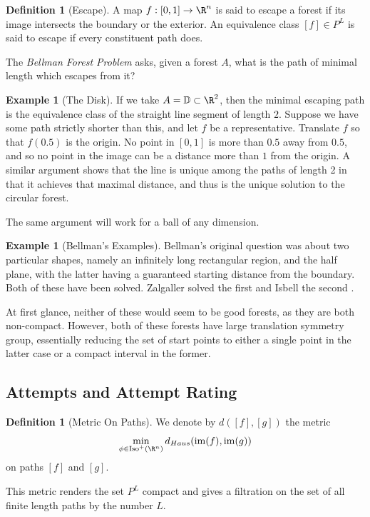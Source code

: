 \documentclass{journal}
\theoremstyle{definition}
\newtheorem{dfn}[thm]{Definition}
\newtheorem{example}[thm]{Example}
\begin{document}
\begin{dfn}[Escape]
A map $f:[0,1]\rightarrow \R^n$ is said to escape a forest if its image intersects the boundary or the exterior. An equivalence class $[f]\in P^L$ is said to escape if every constituent path does.
\end{dfn}
\label{dfn:escape}

The \textit{Bellman Forest Problem} asks, given a forest $A$, what is the path of minimal length which escapes from it?

\begin{example}[The Disk]
If we take $A = \mathbb{D}\subset \R^2$, then the minimal escaping path is the equivalence class of the straight line segment of length $2$.
Suppose we have some path strictly shorter than this, and let $f$ be a representative. Translate $f$ so that $f(0.5)$ is the origin. No point in $[0,1]$ is more than $0.5$ away from $0.5$, and so no point in the image can be a distance more than $1$  from the origin. A similar argument shows that the line is unique among the paths of length 2 in that it achieves that maximal distance, and thus is the unique solution to the circular forest.
\end{example}
\label{example:disk}
The same argument will work for a ball of any dimension.

\begin{example}[Bellman's Examples]
Bellman's original question was about two particular shapes, namely an infinitely long rectangular region, and the half plane, with the latter having a guaranteed starting distance from the boundary. Both of these have been solved. Zalgaller solved the first \cite{Zalgaller1} and Isbell the second \cite{isbell1957optimal}.

At first glance, neither of these would seem to be good forests, as they are both non-compact. However, both of these forests have large translation symmetry group, essentially reducing the set of start points to either a single point in the latter case or a compact interval in the former. 

\end{example}
\label{example:bell}

\subsection{Attempts and Attempt Rating}
\label{sec:twopointone}
\begin{dfn}[Metric On Paths]
We denote by $d([f],[g])$ the metric $$\min_{\phi \in \mathrm{Iso}^+(\R^n)}d_{Haus}(\mathrm{im}(f),\mathrm{im}(g))$$ on paths $[f]$ and $[g]$. 
\end{dfn}
\label{dfn:pathmetric}
This metric renders the set $P^L$ compact and gives a filtration on the set of all finite length paths by the number $L$.
\end{document}
